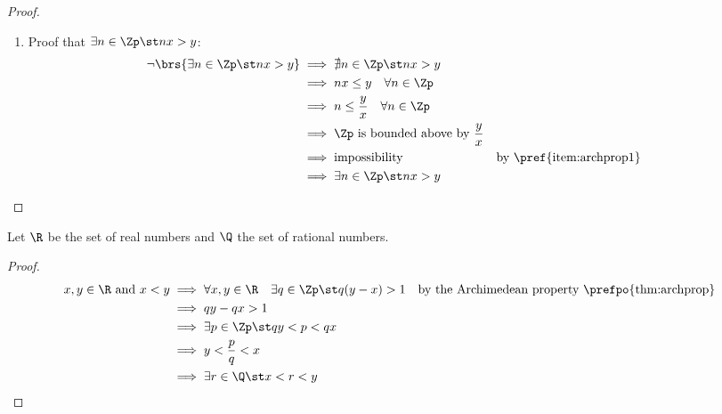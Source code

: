 \begin{proof}
\begin{enumerate}
  \item Proof that $\exists n\in\Zp \st nx > y$:
    \begin{align*}
      \lnot\brs{\exists n\in\Zp \st nx > y}
        &\implies \nexists n\in\Zp \st nx > y
      \\&\implies nx \le y \quad\forall n\in\Zp
      \\&\implies n \le \frac{y}{x} \quad\forall n\in\Zp
      \\&\implies \text{$\Zp$ is bounded above by $\frac{y}{x}$}
      \\&\implies \text{impossibility}
        && \text{by \pref{item:archprop1}}
      \\&\implies \exists n\in\Zp \st nx > y
    \end{align*}

\end{enumerate}
\end{proof}

\begin{theorem}
\label{thm:ran_xry}
Let $\R$ be the set of real numbers and $\Q$ the set of rational numbers.
\end{theorem}
\begin{proof}
\begin{align*}
  x,y\in\R \text{ and } x< y
    &\implies \forall x,y\in\R \quad \exists q\in\Zp \st q(y-x) > 1
    & \text{by the Archimedean property \prefpo{thm:archprop}}
  \\&\implies qy - qx > 1
  \\&\implies \exists p\in\Zp \st qy < p < qx
  \\&\implies y < \frac{p}{q} < x
  \\&\implies \exists r\in\Q \st x< r< y
\end{align*}
\end{proof}


